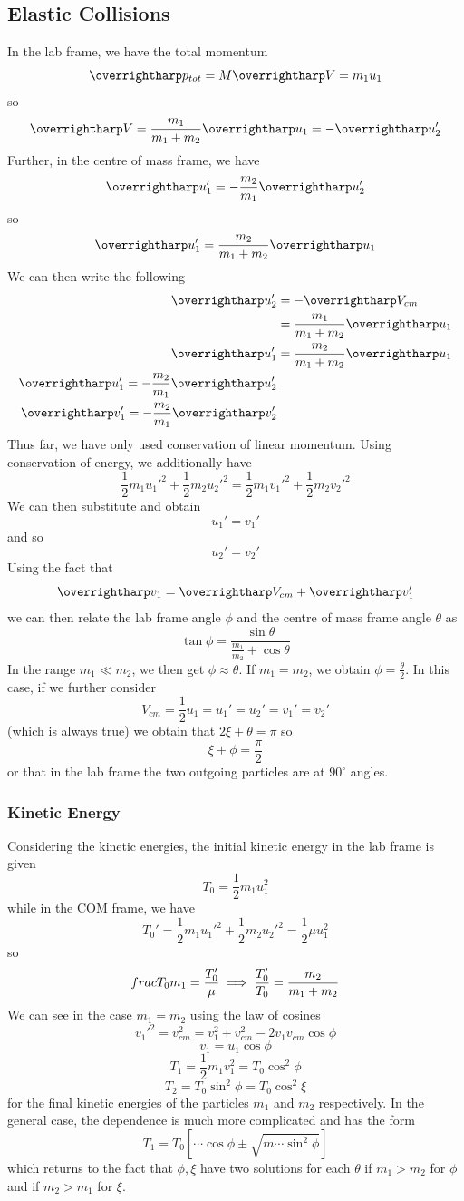 \subsection{Elastic Collisions}
In the lab frame, we have the total momentum
\[\vv p_{tot} = M\vv{V} = m_1u_1\]
so
\[\vv V =\frac{m_1}{m_1+m_2}\vv u_1 = -\vv u_2'\]
Further, in the centre of mass frame, we have
\[\vv u_1' = -\frac{m_2}{m_1}\vv u_2'\]
so
\[\vv u_1' = \frac{m_2}{m_1+m_2}\vv u_1\]
We can then write the following
\begin{align*}
	\vv u_2' &= -\vv V_{cm}\\
		 &= \frac{m_1}{m_1+m_2} \vv u_1\\
	\vv u_1' &= \frac{m_2}{m_1+m_2} \vv u_1\\
	\vv u_1' = -\frac{m_2}{m_1} \vv u_2'\\
	\vv v_1' = -\frac{m_2}{m_1} \vv v_2'
\end{align*}
Thus far, we have only used conservation of linear momentum. Using conservation of energy, we additionally have
\[\frac{1}{2}m_1 u_1'^2 + \frac{1}{2}m_2 u_2'^2 = \frac{1}{2}m_1v_1'^2 + \frac{1}{2}m_2v_2'^2\]
We can then substitute and obtain
\[u_1' = v_1'\]
and so
\[u_2'=v_2'\]
Using the fact that
\[\vv v_1 = \vv V_{cm} +\vv v_1'\]
we can then relate the lab frame angle \(\phi\) and the centre of mass frame angle \(\theta\) as 
\begin{equation}
	\tan\phi = \frac{\sin\theta}{\frac{m_1}{m_2}+\cos\theta}
\end{equation}
In the range \(m_1\ll m_2\), we then get \(\phi\approx\theta\). If \(m_1=m_2\), we obtain \(\phi = \frac{\theta}{2}\). In this case, if we further consider
\[V_{cm} = \frac{1}{2}u_1 = u_1' = u_2' = v_1' = v_2'\]
(which is always true) we obtain that \(2\xi + \theta = \pi\) so
\[\xi+\phi = \frac{\pi}{2}\]
or that in the lab frame the two outgoing particles are at \(90^\circ\) angles.

\subsubsection{Kinetic Energy}
Considering the kinetic energies, the initial kinetic energy in the lab frame is given
\[T_0 = \frac{1}{2}m_1u_1^2\]
while in the COM frame, we have
\[T_0' = \frac{1}{2}m_1u_1'^2+\frac{1}{2}m_2u_2'^2 = \frac{1}{2}\mu u_1^2\]
so
\[frac{T_0}{m_1} = \frac{T_0'}{\mu}\implies \frac{T_0'}{T_0} = \frac{m_2}{m_1+m_2}\]
We can see in the case \(m_1 = m_2\) using the law of cosines
\[v_1'^2 = v_{cm}^2 = v_1^2 + v_{cm}^2 - 2 v_1 v_{cm}\cos\phi\]
\[v_1 = u_1\cos\phi\]
\[T_1 = \frac{1}{2}m_1v_1^2 = T_0\cos^2\phi\]
\[T_2 = T_0\sin^2\phi = T_0\cos^2\xi\]
for the final kinetic energies of the particles \(m_1\) and \(m_2\) respectively. In the general case, the dependence is much more complicated and has the form
\[T_1 = T_0\left[\cdots \cos\phi\pm\sqrt{m\cdots\sin^2\phi}\right]\]
which returns to the fact that \(\phi,\xi\) have two solutions for each \(\theta\) if \(m_1>m_2\) for \(\phi\) and if \(m_2>m_1\) for \(\xi\).

